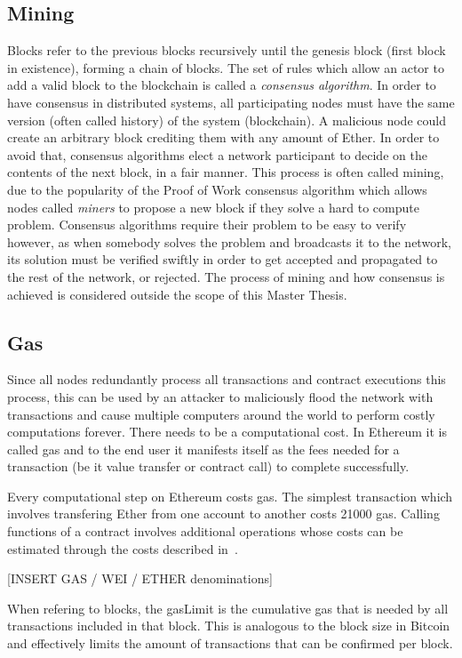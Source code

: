 \subsection{Mining}
Blocks refer to the previous blocks recursively until the genesis block (first block in existence), forming a chain of blocks. The set of rules which allow an actor to add a valid block to the blockchain is called a \textit{consensus algorithm}. In order to have consensus in distributed systems, all participating nodes must have the same version (often called history) of the system (blockchain). A malicious node could create an arbitrary block crediting them with any amount of Ether. In order to avoid that, consensus algorithms elect a network participant to decide on the contents of the next block, in a fair manner. This process is often called mining, due to the popularity of the Proof of Work consensus algorithm which allows nodes called \textit{miners} to propose a new block if they solve a hard to compute problem. Consensus algorithms require their problem to be easy to verify however, as when somebody solves the problem and broadcasts it to the network, its solution must be verified swiftly in order to get accepted and propagated to the rest of the network, or rejected. The process of mining and how consensus is achieved is considered outside the scope of this Master Thesis.


\subsection{Gas}
Since all nodes redundantly process all transactions and contract executions this process, this can be used by an attacker to maliciously flood the network with transactions and cause multiple computers around the world to perform costly computations forever. There needs to be a computational cost. In Ethereum it is called gas and to the end user it manifests itself as the fees needed for a transaction (be it value transfer or contract call) to complete successfully.

Every computational step on Ethereum costs gas. The simplest transaction which involves transfering Ether from one account to another costs 21000 gas. Calling functions of a contract involves additional operations whose costs can be estimated through the costs described in~\cite{gas, ethereum}. 

[INSERT GAS / WEI / ETHER denominations]

When refering to blocks, the gasLimit is the cumulative gas that is needed by all transactions included in that block. This is analogous to the block size in Bitcoin and effectively limits the amount of transactions that can be confirmed per block.

